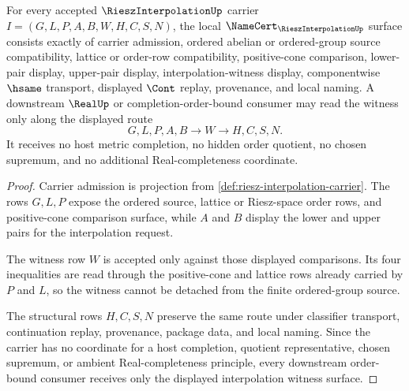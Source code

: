 \begin{theorem}
\label{thm:riesz-interpolation-namecert-obligations}
For every accepted $\RieszInterpolationUp$ carrier $I=(G,L,P,A,B,W,H,C,S,N)$, the local $\NameCert_{\RieszInterpolationUp}$ surface consists exactly of carrier admission, ordered abelian or ordered-group source compatibility, lattice or order-row compatibility, positive-cone comparison, lower-pair display, upper-pair display, interpolation-witness display, componentwise $\hsame$ transport, displayed $\Cont$ replay, provenance, and local naming. A downstream $\RealUp$ or completion-order-bound consumer may read the witness only along the displayed route
$$
G,L,P,A,B \longrightarrow W \longrightarrow H,C,S,N .
$$
It receives no host metric completion, no hidden order quotient, no chosen supremum, and no additional Real-completeness coordinate.
\end{theorem}
\begin{proof}
Carrier admission is projection from \autoref{def:riesz-interpolation-carrier}. The rows $G,L,P$ expose the ordered source, lattice or Riesz-space order rows, and positive-cone comparison surface, while $A$ and $B$ display the lower and upper pairs for the interpolation request.

The witness row $W$ is accepted only against those displayed comparisons. Its four inequalities are read through the positive-cone and lattice rows already carried by $P$ and $L$, so the witness cannot be detached from the finite ordered-group source.

The structural rows $H,C,S,N$ preserve the same route under classifier transport, continuation replay, provenance, package data, and local naming. Since the carrier has no coordinate for a host completion, quotient representative, chosen supremum, or ambient Real-completeness principle, every downstream order-bound consumer receives only the displayed interpolation witness surface.
\end{proof}


